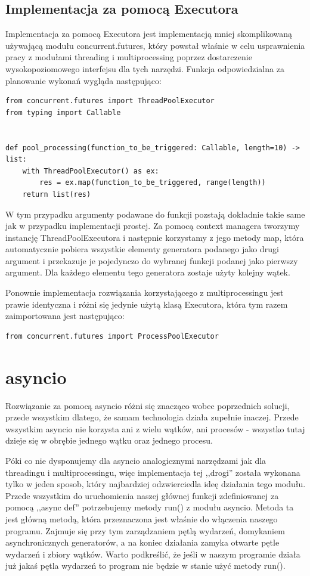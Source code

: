 \subsection{Implementacja za pomocą Executora}
Implementacja za pomocą Executora jest implementacją mniej skomplikowaną używającą modułu concurrent.futures, który powstał właśnie w celu usprawnienia pracy z modułami threading i multiprocessing poprzez dostarczenie wysokopoziomowego interfejsu dla tych narzędzi.
Funkcja odpowiedzialna za planowanie wykonań wygląda następująco:
\begin{lstlisting}
from concurrent.futures import ThreadPoolExecutor
from typing import Callable


def pool_processing(function_to_be_triggered: Callable, length=10) -> list:
    with ThreadPoolExecutor() as ex:
        res = ex.map(function_to_be_triggered, range(length))
    return list(res)
\end{lstlisting}
W tym przypadku argumenty podawane do funkcji pozstają dokładnie takie same jak w przypadku implementacji prostej. Za pomocą context managera tworzymy instancję ThreadPoolExecutora i następnie korzystamy z jego metody map, która automatycznie pobiera wszystkie elementy generatora podanego jako drugi argument i przekazuje je pojedynczo do wybranej funkcji podanej jako pierwszy argument. Dla każdego elementu tego generatora zostaje użyty kolejny wątek.

Ponownie implementacja rozwiązania korzystającego z multiprocessingu jest prawie identyczna i różni się jedynie użytą klasą Executora, która tym razem zaimportowana jest następująco:
\begin{lstlisting}
from concurrent.futures import ProcessPoolExecutor
\end{lstlisting}

\section{asyncio}
Rozwiązanie za pomocą asyncio różni się znacząco wobec poprzednich solucji, przede wszystkim dlatego, że samam technologia działa zupełnie inaczej. Przede wszystkim asyncio nie korzysta ani z wielu wątków, ani procesów - wszystko tutaj dzieje się w obrębie jednego wątku oraz jednego procesu.

Póki co nie dysponujemy dla asyncio analogicznymi narzędzami jak dla threadingu i multiprocessingu, więc implementacja tej ,,drogi'' została wykonana tylko w jeden sposob, który najbardziej odzwierciedla ideę działania tego modułu. Przede wszystkim do uruchomienia naszej głównej funkcji zdefiniowanej za pomocą ,,async def'' potrzebujemy metody run() z modułu asyncio. Metoda ta jest główną metodą, która przeznaczona jest właśnie do włączenia naszego programu. Zajmuje się przy tym zarządzaniem pętlą wydarzeń, domykaniem asynchronicznych generatorów, a na koniec działania zamyka otwarte pętle wydarzeń i zbiory wątków. Warto podkreślić, że jeśli w naszym programie działa już jakaś pętla wydarzeń to program nie będzie w stanie użyć metody run().

